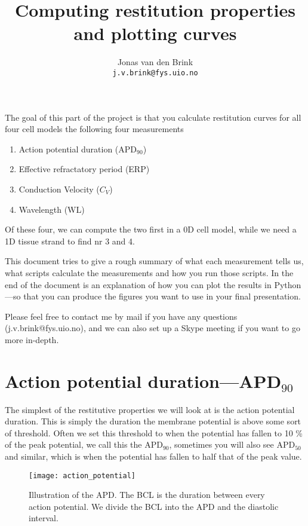 \documentclass[a4paper, 11pt, notitlepage, english]{article}
\title{Computing restitution properties and plotting curves}
\author{Jonas van den Brink \\ \texttt{j.v.brink@fys.uio.no}}
\begin{document}
\maketitle

The goal of this part of the project is that you calculate restitution curves for all four cell models the following four measurements
\begin{enumerate}
  \item Action potential duration (APD$_{90}$)
  \item Effective refractatory period (ERP)
  \item Conduction Velocity ($C_V$)
  \item Wavelength (WL)
\end{enumerate}
Of these four, we can compute the two first in a 0D cell model, while we need a 1D tissue strand to find nr 3 and 4.

This document tries to give a rough summary of what each measurement tells us, what scripts calculate the measurements and how you run those scripts. In the end of the document is an explanation of how you can plot the results in Python---so that you can produce the figures you want to use in your final presentation.

Please feel free to contact me by mail if you have any questions (j.v.brink@fys.uio.no), and we can also set up a Skype meeting if you want to go more in-depth.

\clearpage

\section*{Action potential duration---APD$_{90}$}

The simplest of the restitutive properties we will look at is the action potential duration. This is simply the duration the membrane potential is above some sort of threshold. Often we set this threshold to when the potential has fallen to 10 \% of the peak potential, we call this the APD$_{90}$, sometimes you will also see APD$_{50}$ and similar, which is when the potential has fallen to half that of the peak value.

\begin{figure}[h!tpb]
\centering 
\texttt{[image: action\_potential]}
\caption{Illustration of the APD. The BCL is the duration between every action potential. We divide the BCL into the APD and the diastolic interval.}
\end{figure}
\end{document}
